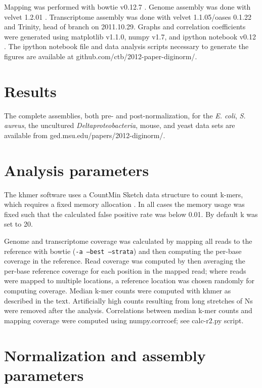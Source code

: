 \documentclass{pnastwo}
\begin{document}
\begin{article}
\begin{materials}
Mapping was performed with bowtie v0.12.7 \cite{pubmed19261174}.
Genome assembly was done with velvet 1.2.01 \cite{pubmed18349386}.
Transcriptome assembly was done with velvet 1.1.05/oases 0.1.22 and
Trinity, head of branch on 2011.10.29.
Graphs and correlation coefficients were generated using matplotlib
v1.1.0, numpy v1.7, and ipython notebook v0.12 \cite{ipython}.  The
ipython notebook file and data analysis scripts necessary to generate
the figures are available at 
  github.com/ctb/2012-paper-diginorm/.

\section{Results}

The complete assemblies, both pre- and post-normalization, for the
{\em E. coli}, {\em S. aureus}, the uncultured {\em
  Deltaproteobacteria}, mouse, and yeast data sets are available from
ged.msu.edu/papers/2012-diginorm/.


\section{Analysis parameters}

The khmer software uses a CountMin Sketch data structure to count
k-mers, which requires a fixed memory allocation
\cite{countminsketch}.  In all cases the memory usage was fixed such
that the calculated false positive rate was below 0.01.  By default k
was set to 20.

Genome and transcriptome coverage was calculated by mapping all reads
to the reference with bowtie ({\tt -a --best --strata}) and then
computing the per-base coverage in the reference.  Read coverage was
computed by then averaging the per-base reference coverage for each
position in the mapped read; where reads were mapped to multiple
locations, a reference location was chosen randomly for computing
coverage.  Median k-mer counts were computed with khmer as described
in the text.  Artificially high counts resulting from long stretches
of Ns were removed after the analysis.
Correlations between median k-mer counts and mapping coverage were
computed using numpy.corrcoef; see calc-r2.py script.

\section{Normalization and assembly parameters}


\end{materials}
\end{article}
\end{document}
